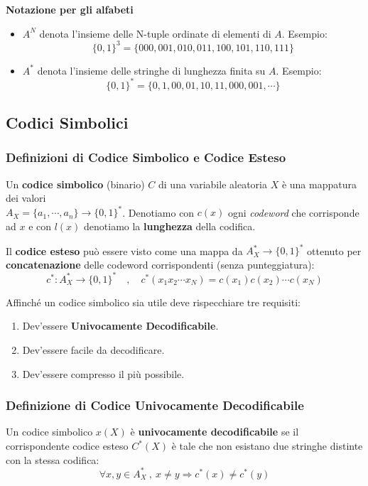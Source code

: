 \textbf{Notazione per gli alfabeti}
\begin{itemize}
	\item $A^N$ denota l'insieme delle N-tuple ordinate di elementi di $A$. Esempio:
	$$
	\{0,1\}^3 = \{000,001,010,011,100,101,110,111\}
	$$
	\item $A^*$ denota l'insieme delle stringhe di lunghezza finita su $A$. Esempio:
	$$
	\{0,1\}^* = \{0,1,00,01,10,11,000,001,\cdots\}
	$$
\end{itemize}

\subsection{Codici Simbolici}
\subsubsection{Definizioni di Codice Simbolico e Codice Esteso}
Un \textbf{codice simbolico} (binario) $C$ di una variabile aleatoria $X$ è una mappatura dei valori\\ $A_X = \{a_1, \cdots, a_n\} \rightarrow \{0,1\}^*$. Denotiamo con $c(x)$ ogni \textit{codeword} che corrisponde ad $x$ e con $l(x)$ denotiamo la \textbf{lunghezza} della codifica.

Il \textbf{codice esteso} può essere visto come una mappa da $A_X^* \rightarrow \{0,1\}^*$ ottenuto per \textbf{concatenazione} delle codeword corrispondenti (senza punteggiatura):
\begin{equation}
	c^*:A_X^*\rightarrow \{0,1\}^* \quad , \quad c^*(x_1 x_2 \cdots x_N) = c(x_1)c(x_2)\cdots c(x_N)
\end{equation}

Affinché un codice simbolico sia utile deve rispecchiare tre requisiti:
\begin{enumerate}
	\item Dev'essere \textbf{Univocamente Decodificabile}.
	\item Dev'essere facile da decodificare.
	\item Dev'essere compresso il più possibile.
\end{enumerate}

\subsubsection{Definizione di Codice Univocamente Decodificabile}
Un codice simbolico $x(X)$ è \textbf{univocamente decodificabile} se il corrispondente codice esteso $C^*(X)$ è tale che non esistano due stringhe distinte con la stessa codifica:
$$
\forall x,y \in A_X^*\ ,\ x \neq y \Rightarrow c^*(x) \neq c^*(y)
$$

